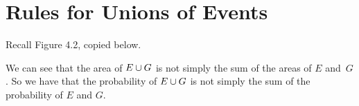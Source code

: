 \section{Rules for Unions of Events}
Recall Figure 4.2, copied below.
\par
\begin{figure}[h]
\centering
{}
\end{figure}
We can see that the area of $E \cup G$ is not simply the sum of the areas of $E$ and~$G$. So we have that the probability of $E \cup G$ is not simply the sum of the probability of $E$ and $G$.